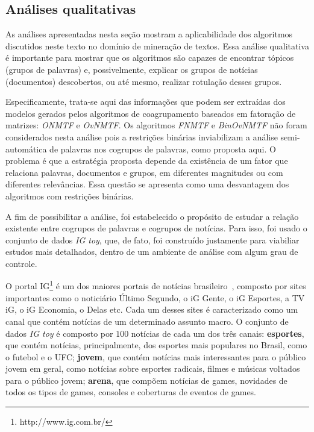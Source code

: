 \documentclass[
    12pt,                %
    oneside,            %
    a4paper,            %
    english,            %
    brazil                %
    ]{abntex2ppgsi}
\begin{document}
\subsection{Análises qualitativas}

As análises apresentadas nesta seção mostram a aplicabilidade dos algoritmos discutidos neste texto no domínio de mineração de textos. Essa análise qualitativa é importante para mostrar que os algoritmos são capazes de encontrar tópicos (grupos de palavras) e, possivelmente, explicar os grupos de notícias (documentos) descobertos, ou até mesmo, realizar rotulação desses grupos.

Especificamente, trata-se aqui das informações que podem ser extraídas dos modelos gerados pelos algoritmos de coagrupamento baseados em fatoração de matrizes: \textit{ONMTF} e \textit{OvNMTF}. Os algoritmos \textit{FNMTF} e \textit{BinOvNMTF} não foram considerados nesta análise pois a restrições binárias inviabilizam a análise semi-automática de palavras nos cogrupos de palavras, como proposta aqui. O problema é que a estratégia proposta depende da existência de um fator que relaciona palavras, documentos e grupos, em diferentes magnitudes ou com diferentes relevâncias. Essa questão se apresenta como uma desvantagem dos algoritmos com restrições binárias.

A fim de possibilitar a análise, foi estabelecido o propósito de estudar a relação existente entre cogrupos de palavras e cogrupos de notícias. Para isso, foi usado o conjunto de dados \textit{IG toy}, que, de fato, foi construído justamente para viabiliar estudos mais detalhados, dentro de um ambiente de análise com algum grau de controle.

O portal IG\footnote{http://www.ig.com.br/} é um dos maiores portais de notícias brasileiro~\cite{topsites}, composto por sites importantes como o noticiário Último Segundo, o iG Gente, o iG Esportes, a TV iG, o iG Economia, o Delas etc. Cada um desses sites é caracterizado como um canal que contém notícias de um determinado assunto macro. O conjunto de dados \textit{IG toy} é composto por $100$ notícias de cada um dos três canais: \textbf{esportes}, que contém notícias, principalmente, dos esportes mais populares no Brasil, como o futebol e o UFC; \textbf{jovem}, que contém notícias mais interessantes para o público jovem em geral, como notícias sobre esportes radicais, filmes e músicas voltados para o público jovem; \textbf{arena}, que compõem notícias de games, novidades de todos os tipos de games, consoles e coberturas de eventos de games.
\end{document}
